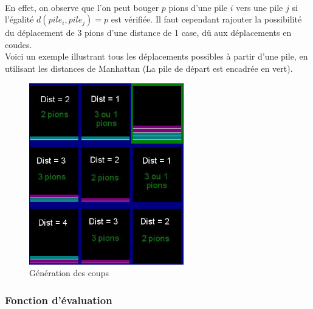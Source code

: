 \documentclass[article, backcover, french, nodocumentinfo]{upmethodology-document}
\begin{document}
				\paragraph{}
					En effet, on observe que l'on peut bouger $p$ pions d'une pile $i$ vers une pile $j$ si l'égalité $d(pile_{i}, pile_{j}) = p$ est vérifiée. Il faut cependant rajouter la possibilité du déplacement de 3 pions d'une distance de 1 case, dû aux déplacements en coudes.\\
					Voici un exemple illustrant tous les déplacements possibles à partir d'une pile, en utilisant les distances de Manhattan (La pile de départ est encadrée en vert).
					\begin{figure}[h!]
						\centering
						\includegraphics[width=0.6\textwidth]{figures/GenerationCoup}
						\caption{Génération des coups}
					\end{figure}
			\subsubsection{Fonction d'évaluation}
\end{document}
